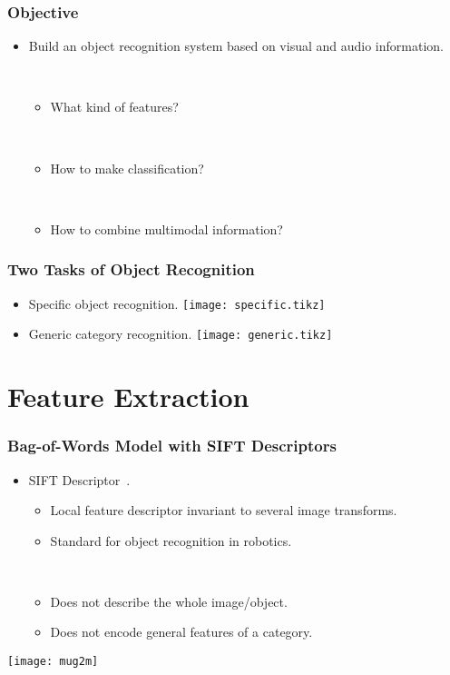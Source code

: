 \documentclass{beamer}
\begin{document}
\begin{frame}
  \frametitle{Objective}

  \begin{itemize}
    \item Build an object recognition system based on visual and audio information.

      ~
      \begin{itemize}
        \item What kind of features?

          ~
        \item How to make classification?

          ~
        \item How to combine multimodal information?
      \end{itemize}
  \end{itemize}
\end{frame}

\begin{frame}
  \frametitle{Two Tasks of Object Recognition}

  \begin{itemize}
    \item Specific object recognition.
      \texttt{[image: specific.tikz]}

    \item Generic category recognition.
      \texttt{[image: generic.tikz]}
  \end{itemize}
\end{frame}

\section{Feature Extraction}
\begin{frame}
  \frametitle{Bag-of-Words Model with SIFT Descriptors}

  \begin{itemize}
    \item SIFT Descriptor~\cite{lowe_object_1999}. 
      \begin{itemize}
        \item Local feature descriptor invariant to several image transforms.
        \item Standard for object recognition in robotics.

          ~
        \item Does not describe the whole image/object.
        \item Does not encode general features of a category.
      \end{itemize}
  \end{itemize}

  \centering
  \texttt{[image: mug2m]}
\end{frame}
\end{document}

